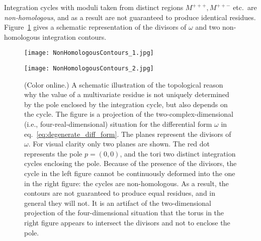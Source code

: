 \documentclass[dvipsnames,preprint,12pt,sort&compress]{elsarticle}
\begin{document}
Integration cycles with moduli taken from distinct regions $M^{+++}, M^{++-}$ etc.~are
\emph{non-homologous}, and as a result are not guaranteed to produce identical residues.
Figure~\ref{fig:non-homologous_contours} gives a schematic representation of the
divisors of $\omega$ and two non-homologous integration contours.


\begin{figure}[!htb]
    \centering
    \begin{minipage}{.5\textwidth}
        \flushleft
        \texttt{[image: NonHomologousContours\_1.jpg]}
    \end{minipage}%
    \begin{minipage}{0.5\textwidth}
        \texttt{[image: NonHomologousContours\_2.jpg]}
    \end{minipage}
\vspace{-2mm}
\caption{(Color online.) A schematic illustration of the topological reason
why the value of a multivariate residue is not uniquely determined
by the pole enclosed by the integration cycle, but also depends on the cycle.
The figure is a projection of the two-complex-dimensional (i.e., four-real-dimensional)
situation for the differential form $\omega$ in eq.~\eqref{eq:degenerate_diff_form}.
The planes represent the divisors of $\omega$.
For visual clarity only two planes are shown. The red dot represents the pole
$p = (0,0)$, and the tori two distinct integration cycles enclosing the pole.
Because of the presence of the divisors, the cycle in the left figure cannot
be continuously deformed into the one in the right figure: the cycles are non-homologous.
As a result, the contours are not guaranteed to produce equal residues, and in general they will not.
It is an artifact of the two-dimensional projection of the four-dimensional situation
that the torus in the right figure appears to intersect the divisors and not to enclose
the pole.}
\label{fig:non-homologous_contours}
\end{figure}
\end{document}

